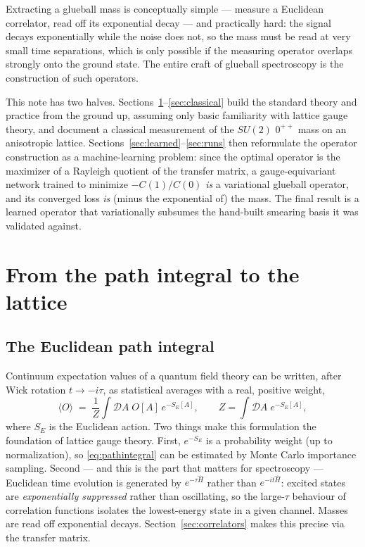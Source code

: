 \documentclass[11pt,a4paper]{article}
\begin{document}
Extracting a glueball mass is conceptually simple --- measure a Euclidean
correlator, read off its exponential decay --- and practically hard: the
signal decays exponentially while the noise does not, so the mass must be read
at very small time separations, which is only possible if the measuring
operator overlaps strongly onto the ground state. The entire craft of glueball
spectroscopy is the construction of such operators.

This note has two halves. Sections~\ref{sec:pathintegral}--\ref{sec:classical}
build the standard theory and practice from the ground up, assuming only
basic familiarity with lattice gauge theory, and document a classical
measurement of the $SU(2)$ $0^{++}$ mass on an anisotropic lattice.
Sections~\ref{sec:learned}--\ref{sec:runs} then reformulate the operator
construction as a machine-learning problem: since the optimal operator is the
maximizer of a Rayleigh quotient of the transfer matrix, a gauge-equivariant
network trained to minimize $-C(1)/C(0)$ \emph{is} a variational glueball
operator, and its converged loss \emph{is} (minus the exponential of) the
mass. The final result is a learned operator that variationally subsumes the
hand-built smearing basis it was validated against.

\section{From the path integral to the lattice}
\label{sec:pathintegral}

\subsection{The Euclidean path integral}

Continuum expectation values of a quantum field theory can be written, after
Wick rotation $t\to -i\tau$, as statistical averages with a real, positive
weight,
\begin{equation}
  \langle O \rangle
  \;=\;
  \frac{1}{Z}\int \mathcal{D}A\; O[A]\, e^{-S_E[A]},
  \qquad
  Z=\int \mathcal{D}A\; e^{-S_E[A]},
  \label{eq:pathintegral}
\end{equation}
where $S_E$ is the Euclidean action. Two things make this formulation the
foundation of lattice gauge theory. First, $e^{-S_E}$ is a probability weight
(up to normalization), so \eqref{eq:pathintegral} can be estimated by Monte
Carlo importance sampling. Second --- and this is the part that matters for
spectroscopy --- Euclidean time evolution is generated by $e^{-\tau\hat H}$
rather than $e^{-it\hat H}$: excited states are \emph{exponentially
suppressed} rather than oscillating, so the large-$\tau$ behaviour of
correlation functions isolates the lowest-energy state in a given channel.
Masses are read off exponential decays. Section~\ref{sec:correlators} makes
this precise via the transfer matrix.
\end{document}
